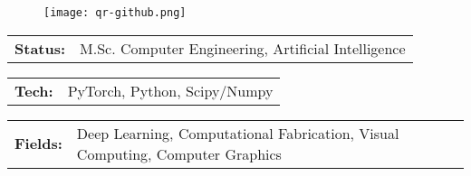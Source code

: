 \documentclass[10pt,A4]{article}
\newcommand{\tzlarrow}{(0,0) -- (0.2,0) -- (0.3,0.2) -- (0.2,0.4) -- (0,0.4) -- (0.1,0.2) -- cycle;}
\newcommand{\larrow}[1]
{\begin{tikzpicture}[scale=0.58]
	 \filldraw[fill=#1!100,draw=#1!100!black]  \tzlarrow
 \end{tikzpicture}
}
\newcommand{\metasection}[2]
{
\begin{tabular*}{1\textwidth}{p{2.0cm} p{10cm}}
\larrow{sectcol}	\normalsize{\textbf{#1}}&#2\\[12pt]
\end{tabular*}
}
\begin{document}
\pagestyle{fancy}	


\vspace{-20.55pt}


\hspace{-0.25\linewidth}\colorbox{bgcol}{}



\begin{figure}[H]
\begin{flushright}
	\texttt{[image: qr-github.png]}
\end{flushright}
\end{figure}



\vspace{-114pt}

\metasection{Status:}{M.Sc. Computer Engineering, Artificial Intelligence}
\metasection{Tech:}{PyTorch, Python, Scipy/Numpy}
\metasection{Fields:}{Deep Learning, Computational Fabrication, Visual Computing, Computer Graphics}
\vspace{12pt}  %
\end{document}
